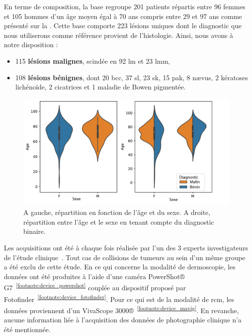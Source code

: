 En terme de composition, la base regroupe 201 patients répartis entre 96 femmes et 105 hommes d'un âge moyen égal à 70 ans compris entre 29 et 97 ans comme présenté sur la . Cette base comporte 223 lésions uniques dont le diagnostic que nous utiliserons comme référence provient de l'histologie. Ainsi, nous avons à notre disposition :
\begin{itemize}
    \item 115 \textbf{lésions malignes}, scindée en 92 \gls{lm} et 23 \gls{lmm},
    \item 108 \textbf{lésions bénignes}, dont 20 \gls{bcc}, 37 \gls{sl}, 23 \gls{sk}, 15 \gls{pak}, 8 nævus, 2 kératoses lichénoïde, 2 cicatrices et 1 maladie de Bowen pigmentée.
\end{itemize}\par

\begin{figure}[H]
    \centering
    \includegraphics[width=0.8\linewidth]{contents/chapter_3_1/resources/statistics_age_sex.pdf}
    \caption{A gauche, répartition en fonction de l'âge et du sexe. A droite, répartition entre l'âge et le sexe en tenant compte du diagnostic binaire.}
    \label{fig:statistics_age_sex}
\end{figure}\par

Les acquisitions ont été à chaque fois réalisée par l'un des 3 experts investigateurs de l'étude clinique~\cite{Cinotti2018}. Tout cas de collisions de tumeurs au sein d'un même groupe a été exclu de cette étude. En ce qui concerne la modalité de dermoscopie, les données ont été produites à l'aide d'une caméra PowerShot® G7~\textsuperscript{\ref{footnote:device_powershot}} couplée au dispositif proposé par Fotofinder~\textsuperscript{\ref{footnote:device_fotofinder}}. Pour ce qui est de la modalité de \gls{rcm}, les données proviennent d'un VivaScope 3000®~\textsuperscript{\ref{footnote:device_mavig}}. En revanche, aucune information liée à l'acquisition des données de photographie clinique n'a été mentionnée.\par

